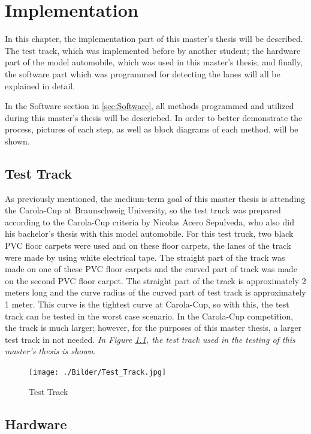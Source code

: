%
\chapter{Implementation}\label{cha:Implementation}
%
In this chapter, the implementation part of this master's thesis will be described. The test track, which was implemented before by another student; the hardware part of the model automobile, which was used in this master's thesis; and finally, the software part which was programmed for detecting the lanes will all be  explained in detail.

In the Software section in \ref{sec:Software}, all methods programmed and utilized during this master's thesis will be descriebed. In order to better demonstrate the process, pictures of each step, as well as block diagrams of each method, will be shown.

%
\section{Test Track}\label{sec:Test Track}

As previously mentioned, the medium-term goal of this master thesis is attending the Carola-Cup at Braunschweig University, so the test truck was prepared according to the Carola-Cup criteria by Nicolas Acero Sepulveda, who also did his bachelor's thesis with this model automobile. For this test truck, two black PVC floor carpets were used and on these floor carpets, the lanes of the track were made by using white electrical tape. The straight part of the track was made on one of these PVC floor carpets and the curved part of track was made on the second PVC floor carpet. The straight part of the track is approximately 2 meters long and the curve radius of the curved part of test track is approximately 1 meter. This curve is the tightest curve at Carola-Cup, so with this, the test track can be tested in the worst case scenario. In the Carola-Cup competition, the track is much larger; however, for the purposes of this master thesis, a larger test track in not needed. \emph{\color{blue}In Figure \ref{fig:Test_Track}, the test track used in the testing of this master's thesis is shown.}


\begin{figure}[H]
	\centering
		\texttt{[image: ./Bilder/Test\_Track.jpg]}
	\caption{Test Track}
	\label{fig:Test_Track}
\end{figure}



%
\section{Hardware}\label{sec:Hardware}


